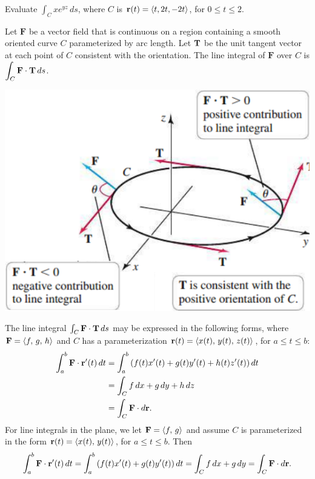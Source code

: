 \documentclass[mathNotesPreamble]{subfiles}
\begin{document}
  \begin{ex*}
    Evaluate $\displaystyle \int_C xe^{yz}\,ds$, where $C$ is ${\mathbf{r}}(t)={\left\langle t,2t,-2t \right\rangle}$, for $0\leq t\leq 2$.
  \end{ex*}
  \pagebreak

  \begin{defn*}
    Let $\mathbf F$ be a vector field that is continuous on a region containing a smooth oriented curve $C$ parameterized by arc length. Let ${\mathbf{T}}$ be the unit tangent vector at each point of $C$ consistent with the orientation. The line integral of $\mathbf F$ over $C$ is $\displaystyle\int_C \mathbf F\cdot{\mathbf{T}}\,ds$.
  \end{defn*}

  \begin{center}
    \includegraphics[width=0.425\linewidth]{images/briggs_17_02/fig17_19}
    \vspace*{-0.5\baselineskip}
  \end{center}

  \begin{thmBox*}
    The line integral $\int_C \mathbf F\cdot{\mathbf{T}}\,ds$ may be expressed in the following forms, where $\mathbf F={\left\langle f,\,g,\,h \right\rangle}$ and $C$ has a parameterization ${\mathbf{r}}(t)={\left\langle x(t),\,y(t),\,z(t) \right\rangle}$, for $a\leq t\leq b$:
    \begin{align*}
      \int_a^b \mathbf F\cdot{\mathbf{r}}'(t)\,dt &=\int_a^b {\left(f(t)x'(t)+g(t)y'(t)+h(t)z'(t)\right)}\,dt\\
        &=\int_C f\,dx+g\,dy+h\,dz\\
        &=\int_C \mathbf F\cdot d{\mathbf{r}}.
    \end{align*}
    For line integrals in the plane, we let $\mathbf F={\left\langle f,\,g \right\rangle}$ and assume $C$ is parameterized in the form ${\mathbf{r}}(t)={\left\langle x(t),\,y(t) \right\rangle}$, for $a\leq t\leq b$. Then
      \[\int_a^b \mathbf F\cdot {\mathbf{r}}'(t)\,dt=\int_a^b {\left(f(t)x'(t)+g(t)y'(t)\right)}\,dt= \int_C f\,dx+g\,dy=\int_C \mathbf F\cdot d{\mathbf{r}}.\]
  \end{thmBox*}
  \pagebreak
\end{document}
